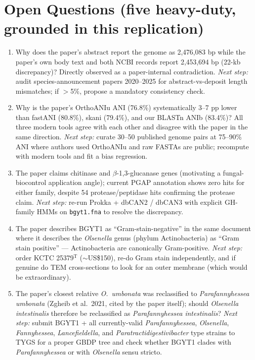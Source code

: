 \documentclass[11pt]{article}
\begin{document}
\section{Open Questions (five heavy-duty, grounded in this replication)}

\begin{enumerate}
\item Why does the paper's abstract report the genome as 2{,}476{,}083 bp while the paper's own body text and both NCBI records report 2{,}453{,}694 bp (22-kb discrepancy)? Directly observed as a paper-internal contradiction. \emph{Next step:} audit species-announcement papers 2020--2025 for abstract-vs-deposit length mismatches; if $>$5\%, propose a mandatory consistency check.
\item Why is the paper's OrthoANIu ANI (76.8\%) systematically 3--7 pp lower than fastANI (80.8\%), skani (79.4\%), and our BLASTn ANIb (83.4\%)? All three modern tools agree with each other and disagree with the paper in the same direction. \emph{Next step:} curate 30--50 published genome pairs at 75--90\% ANI where authors used OrthoANIu and raw FASTAs are public; recompute with modern tools and fit a bias regression.
\item The paper claims chitinase and $\beta$-1,3-glucanase genes (motivating a fungal-biocontrol application angle); current PGAP annotation shows zero hits for either family, despite 54 protease/peptidase hits confirming the protease claim. \emph{Next step:} re-run Prokka + dbCAN2 / dbCAN3 with explicit GH-family HMMs on \texttt{bgyt1.fna} to resolve the discrepancy.
\item The paper describes BGYT1 as ``Gram-stain-negative'' in the same document where it describes the \emph{Olsenella} genus (phylum Actinobacteria) as ``Gram stain positive'' --- Actinobacteria are canonically Gram-positive. \emph{Next step:} order KCTC 25379${}^{\mathrm{T}}$ ($\sim$US\$150), re-do Gram stain independently, and if genuine do TEM cross-sections to look for an outer membrane (which would be extraordinary).
\item The paper's closest relative \emph{O.\ umbonata} was reclassified to \emph{Parafannyhessea umbonata} (Zgheib et al.\ 2021, cited by the paper itself); should \emph{Olsenella intestinalis} therefore be reclassified as \emph{Parafannyhessea intestinalis}? \emph{Next step:} submit BGYT1 + all currently-valid \emph{Parafannyhessea}, \emph{Olsenella}, \emph{Fannyhessea}, \emph{Lancefieldella}, and \emph{Paratractidigestivibacter} type strains to TYGS for a proper GBDP tree and check whether BGYT1 clades with \emph{Parafannyhessea} or with \emph{Olsenella} sensu stricto.
\end{enumerate}
\end{document}
